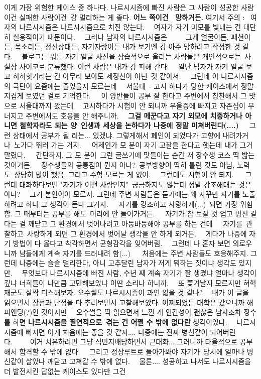 \vspace{5mm}

이게 가장 위험한 케이스 중 하나다.
나르시시즘에 빠진 사람은 그 사람이 성공한 사람이건 실패한 사람이건 걍 멀리하는 게 좋다.
\textbf{어느 쪽이건  망하거든.}
여기서 주의 :  여자의 나르시시즘은 나르시시즘으로 치진 않는다.   여자가 자기 미모를 빛내는 건 대단히 실용적이기 때문이다.   그러나 남자의 나르시시즘은      그게 얼굴이든, 패션이든, 목소리든, 정신상태든, 자기자랑이든 내가 보기엔 걍 아주 망하려고 작정한 것 같다.   블로그든 뭐든 자기 얼굴 사진을 상습적으로 올리는 사람들은 개인적으로는 사실상 사이코로 분류했다. 이런 사람은 내가 걍 피해 간다.   일단 남자가 자기 얼굴 보고 히히힛거리는 건 아무리 보아도 제정신이 아닌 것 같아서.   그런데 이 나르시시즘의 극단이 요즘에는 줄었을지 모르는데   서울대 - 고시 하다가 망한 케이스에서 정말 지겹게 보였던 걸로 기억한다.   이 양반들이 공부 잘 한다고 주변에서 칭찬해서 그 맛으로 서울대까지 왔는데   고시하다가 시험이 안 되니까 우울증에 빠지고 자존심이 무너지고 주변에서도 호응을 안 해주니까.   \textbf{그걸 메꾼다고 자기 외모에 치중하거나 아니면 철학자라도 되는 양 인생과 세상을 논하다가 나중에 정말 미쳐버린다(....)}   그런 상태에서 공부가 될 리는... 있겠냐. 그렇게해서 폐인이 되었다가 고향에 내려가거나 노가다 뛰러 가는 거지.   어제인가 모 분이 자기 고찰을 한다고 햇는데 내가 그거 말렸다.   간단하지, 그 모 분이 그런 글쓰기에 맛들이는 순간 저 장수생 코스 딱 밟는 것이거든.   장수생들의 공통점이 뭔지 아나? 공부방향이 딱히 틀린 것도 아님, 노력도 상당히 많이 했음, 그리고 수험 모르는 게 없어.   그런데도 시험이 안 되지.    그런데 대화하다보면 "자기가 어떤 사람인지" 궁금하지도 않는데 정말 강조해대는 것은 아나?   그거 본인이야 모르지. 그런데 주변 사람들은 듣기에는 왜 자꾸만 자기를 노출하려고 하나 그 생각이 든다 그거지.   자기를 강조하고 사랑하게(...) 되면 가장 위험함. 그 때부터는 공부를 해도 머리에 안 들어가거든.   자기가 참 보잘 것 업고 병신 같다는 걸 깨닫고 그 환경에서 벗어나려고 아둥바둥해야 공부를 하는 건데   자기를 관찰하고 사랑하게 되면 그 환경에서 벗어날 생각을 안 하게 되거든.   게다가 나중에 자기 방법이 다 옳다고 착각하면서 균형감각을 잊어버림.   그런데 나 혼자 보면 외로우니까 남들에게 계속 자기를 드러내려 함(...)    처음에는 주변 사람들도 호응해주지. 그런데 나중에는 슬슬 멀리한다, 아니 고추달린 남자가 저게 뭐하는 짓이냐 생각도 있지만.   무엇보다 나르시시즘에 빠진 사람, 수년 째 계속 자기가 잘 생겼냐 얼마나 생각이 깊냐 너희들이 나만큼 고민해보았냐 이딴 소리나 하니까.   또 쫓겨날지 모르지만 혀혁재군도 살짝 디스해보자. 오수썰도 나르시시즘이 과연 없을 것 같나?   내가 이 글을 읽으면서 장점과 단점을 다 추려보면서 고찰해보았다. 어찌되었든 대학은 갔으니까 해피엔딩(?)인 것이지만   오수썰을 딱 읽으면서 느낀 게 인간성이 괜찮은 남자조차 장수를 하면 \textbf{나르시시즘을 필연적으로 겪는 건 어쩔 수 밖에 없다란} 생각이었다.   나르시시즘에 빠지면 이게 처음에는 좋을 것 같지.... 나중에는 진짜 병신같이 되어버린다.     이거 치유하려면 그냥 식민지배당하면서 근대화... 그러니까 타율적으로 공부해서 합격할 수 밖에 없다.   그리고 정상루트로 돌아가봐야 자기가 당시에 얼마나 병신같이 살았나 깨닫고 고쳐갈 수 밖에 없다.   물론.... 성공하고 나서도 나르시시즘을 더 발전시킨 답없는 케이스도 있다만 그건 